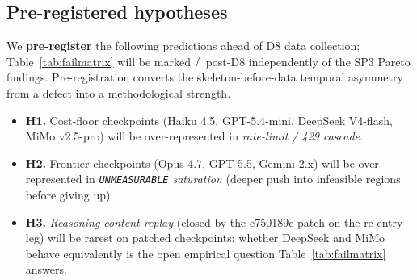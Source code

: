 \subsection{Pre-registered hypotheses}
\label{sec:failures-hypotheses}

We \textbf{pre-register} the following predictions ahead of D8
data collection; Table~\ref{tab:failmatrix} will be marked
\yes/\no\ post-D8 independently of the SP3 Pareto findings.
Pre-registration converts the skeleton-before-data temporal
asymmetry from a defect into a methodological strength.

\begin{itemize}
  \item \textbf{H1.} Cost-floor checkpoints (Haiku 4.5,
    GPT-5.4-mini, DeepSeek V4-flash, MiMo v2.5-pro) will be
    over-represented in \emph{rate-limit / 429 cascade}.
  \item \textbf{H2.} Frontier checkpoints (Opus 4.7, GPT-5.5,
    Gemini 2.x) will be over-represented in
    \emph{\texttt{UNMEASURABLE} saturation} (deeper push into
    infeasible regions before giving up).
  \item \textbf{H3.} \emph{Reasoning-content replay} (closed by
    the e750189c patch on the re-entry leg) will be rarest on
    patched checkpoints; whether DeepSeek and MiMo behave
    equivalently is the open empirical question
    Table~\ref{tab:failmatrix} answers.
\end{itemize}
